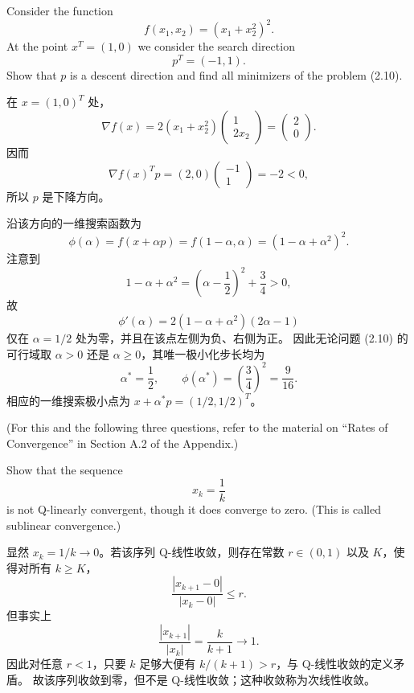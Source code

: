 \documentclass{ctexart}
\begin{document}
\begin{problem}[2.9]
Consider the function
\[
    f(x_1,x_2)=(x_1+x_2^2)^2.
\]
At the point $x^T=(1,0)$ we consider the search direction
\[
    p^T=(-1,1).
\]
Show that $p$ is a descent direction and find all minimizers of the problem (2.10).
\end{problem}

\begin{solution}
在 $x=(1,0)^T$ 处，
\[
    \nabla f(x)
    =2(x_1+x_2^2)\begin{pmatrix}1\\2x_2\end{pmatrix}
    =\begin{pmatrix}2\\0\end{pmatrix}.
\]
因而
\[
    \nabla f(x)^Tp=(2,0)\begin{pmatrix}-1\\1\end{pmatrix}=-2<0,
\]
所以 $p$ 是下降方向。

沿该方向的一维搜索函数为
\[
    \phi(\alpha)=f(x+\alpha p)
    =f(1-\alpha,\alpha)
    =(1-\alpha+\alpha^2)^2.
\]
注意到
\[
    1-\alpha+\alpha^2
    =\left(\alpha-\frac12\right)^2+\frac34>0,
\]
故
\[
    \phi'(\alpha)
    =2(1-\alpha+\alpha^2)(2\alpha-1)
\]
仅在 $\alpha=1/2$ 处为零，并且在该点左侧为负、右侧为正。
因此无论问题 (2.10) 的可行域取 $\alpha>0$ 还是 $\alpha\geq0$，其唯一极小化步长均为
\[
    \boxed{\alpha^*=\frac12},
    \qquad
    \phi(\alpha^*)=\left(\frac34\right)^2=\frac9{16}.
\]
相应的一维搜索极小点为 $x+\alpha^*p=(1/2,1/2)^T$。
\end{solution}

\begin{problem}[2.13]
(For this and the following three questions, refer to the material on
``Rates of Convergence'' in Section A.2 of the Appendix.)

Show that the sequence
\[
    x_k=\frac{1}{k}
\]
is not Q-linearly convergent, though it does converge to zero.
(This is called sublinear convergence.)
\end{problem}

\begin{solution}
显然 $x_k=1/k\to0$。若该序列 Q-线性收敛，则存在常数
$r\in(0,1)$ 以及 $K$，使得对所有 $k\geq K$，
\[
    \frac{|x_{k+1}-0|}{|x_k-0|}\leq r.
\]
但事实上
\[
    \frac{|x_{k+1}|}{|x_k|}=\frac{k}{k+1}\longrightarrow1.
\]
因此对任意 $r<1$，只要 $k$ 足够大便有 $k/(k+1)>r$，与 Q-线性收敛的定义矛盾。
故该序列收敛到零，但不是 Q-线性收敛；这种收敛称为次线性收敛。
\end{solution}
\end{document}
